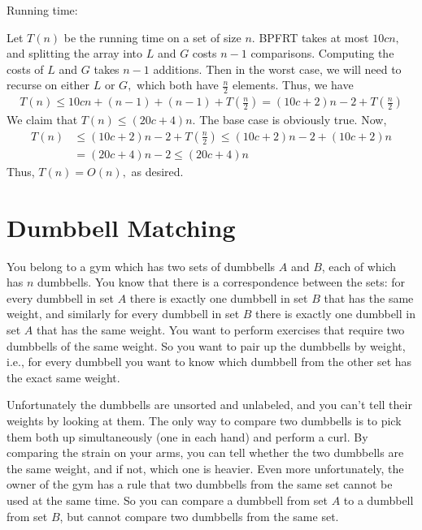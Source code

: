 \documentclass{article}
\begin{document}
\begin{soln}
	Running time:
	\begin{subproof}
		Let $T(n)$ be the running time on a set of size $n.$ BPFRT takes at most $10cn,$ and splitting the array into $L$ and $G$ costs $n-1$ comparisons. Computing the costs of $L$ and $G$ takes $n-1$ additions. Then in the worst case, we will need to recurse on either $L$ or $G,$ which both have $\frac{n}{2}$ elements. Thus, we have
		\begin{align*}
			T(n) \le 10cn + (n-1) + (n-1) + T\left( \frac{n}{2} \right) = (10c+2)n-2 + T\left( \frac{n}{2} \right)
		\end{align*}
		We claim that $T(n)\le (20c+4)n.$ The base case is obviously true. Now,
		\begin{align*}
			T(n)&\le (10c+2)n-2+T\left( \frac{n}{2} \right) \le (10c+2)n-2 + (10c+2)n \\
			&= (20c+4)n-2\le (20c+4)n
		\end{align*}
		Thus, $T(n)=O(n),$ as desired.
	\end{subproof}
\end{soln}

\section{Dumbbell Matching}
You belong to a gym which has two sets of dumbbells $A$ and $B$, each of which has $n$ dumbbells.  You know that there is a correspondence between the sets: for every dumbbell in set $A$ there is exactly one dumbbell in set $B$ that has the same weight, and similarly for every dumbbell in set $B$ there is exactly one dumbbell in set $A$ that has the same weight.  You want to perform exercises that require two dumbbells of the same weight.  So you want to pair up the dumbbells by weight, i.e., for every dumbbell you want to know which dumbbell from the other set has the exact same weight.

Unfortunately the dumbbells are unsorted and unlabeled, and you can't tell their weights by looking at them. The only way to compare two dumbbells is to pick them both up simultaneously (one in each hand) and perform a curl.  By comparing the strain on your arms, you can tell whether the two dumbbells are the same weight, and if not, which one is heavier.  Even more unfortunately, the owner of the gym has a rule that two dumbbells from the same set cannot be used at the same time.  So you can compare a dumbbell from set $A$ to a dumbbell from set $B$, but cannot compare two dumbbells from the same set.  
\end{document}
